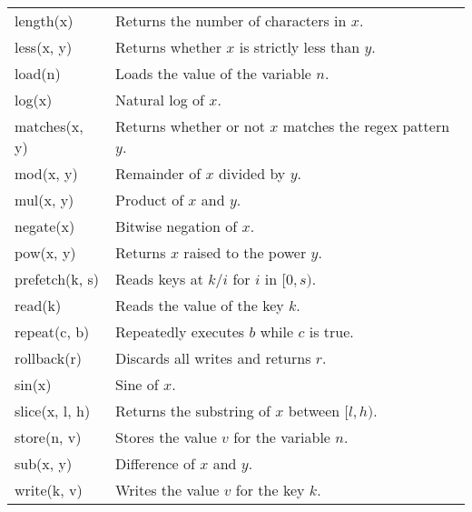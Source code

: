 \documentclass[../main.tex]{subfiles}
\begin{document}
\begin{table}[ht]
\begin{tabular}{l | l}
    length(x)                & Returns the number of characters in $x$.                           \\
    less(x, y)               & Returns whether $x$ is strictly less than $y$.                     \\
    load(n)                  & Loads the value of the variable $n$.                               \\
    log(x)                   & Natural log of $x$.                                                \\
    matches(x, y)            & Returns whether or not $x$ matches the regex pattern $y$.          \\
    mod(x, y)                & Remainder of $x$ divided by $y$.                                   \\
    mul(x, y)                & Product of $x$ and $y$.                                            \\
    negate(x)                & Bitwise negation of $x$.                                           \\
    pow(x, y)                & Returns $x$ raised to the power $y$.                               \\
    prefetch(k, s)           & Reads keys at $k/i$ for $i$ in $[0, s)$.                           \\
    read(k)                  & Reads the value of the key $k$.                                    \\
    repeat(c, b)             & Repeatedly executes $b$ while $c$ is true.                         \\
    rollback(r)              & Discards all writes and returns $r$.                               \\
    sin(x)                   & Sine of $x$.                                                       \\
    slice(x, l, h)           & Returns the substring of $x$ between $[l, h)$.                     \\
    store(n, v)              & Stores the value $v$ for the variable $n$.                         \\
    sub(x, y)                & Difference of $x$ and $y$.                                         \\
    write(k, v)              & Writes the value $v$ for the key $k$.                              \\
  \end{tabular}
  \label{table:expressions}
\end{table}
\end{document}
